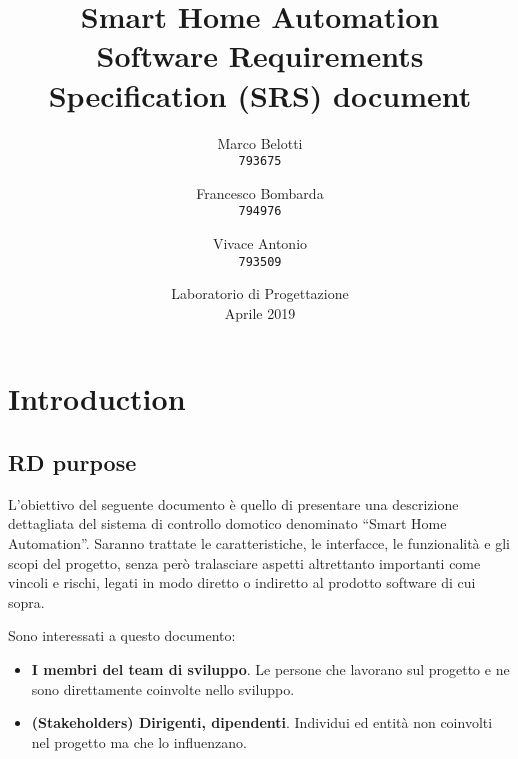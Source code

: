\documentclass[12pt,a4paper]{report}
\begin{document}
\title{%
  \Huge Smart Home Automation\\
  \large Software Requirements Specification (SRS) document\\
    }
\author{
  Marco Belotti\\
  \texttt{793675}
  \and
  Francesco Bombarda\\
  \texttt{794976}
   \and
  Vivace Antonio\\
  \texttt{793509}
}
\date{Laboratorio di Progettazione \\ Aprile 2019}
\maketitle

\tableofcontents



\chapter{Introduction}

\section{RD purpose}
L’obiettivo del seguente documento è quello di presentare una descrizione dettagliata del sistema di controllo domotico denominato “Smart Home Automation”. Saranno trattate le caratteristiche, le interfacce, le funzionalità e gli scopi del progetto, senza però tralasciare aspetti altrettanto importanti come vincoli e rischi, legati in modo diretto o indiretto al prodotto software di cui sopra.

Sono interessati a questo documento:

\begin{itemize}
\item \textbf{I membri del team di sviluppo}. Le persone che lavorano sul progetto e ne sono direttamente coinvolte nello sviluppo.
\item \textbf{(Stakeholders) Dirigenti, dipendenti}. Individui ed entità non coinvolti nel progetto ma che lo influenzano.
\end{itemize}
\end{document}
